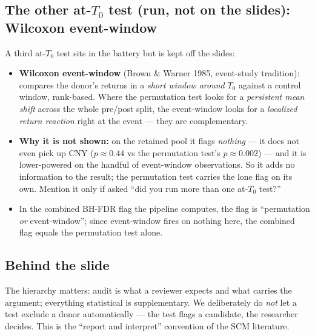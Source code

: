 \documentclass[11pt,a4paper]{article}
\newcommand{\highlight}[1]{\textcolor{accent}{\textbf{#1}}}
\begin{document}
\subsection{The other at-$T_0$ test (run, not on the slides): Wilcoxon event-window}
A third at-$T_0$ test sits in the battery but is kept off the slides:
\begin{itemize}
  \item \highlight{Wilcoxon event-window} (Brown \& Warner 1985, event-study tradition): compares the
    donor's returns in a \emph{short window around} $T_0$ against a control window, rank-based. Where the
    permutation test looks for a \emph{persistent mean shift} across the whole pre/post split, the
    event-window looks for a \emph{localized return reaction} right at the event --- they are complementary.
  \item \highlight{Why it is not shown:} on the retained pool it flags \emph{nothing} --- it does not even
    pick up CNY ($p \approx 0.44$ vs the permutation test's $p \approx 0.002$) --- and it is lower-powered
    on the handful of event-window observations. So it adds no information to the result; the permutation
    test carries the lone flag on its own. Mention it only if asked ``did you run more than one at-$T_0$ test?''
  \item In the combined BH-FDR flag the pipeline computes, the flag is ``permutation \emph{or} event-window'';
    since event-window fires on nothing here, the combined flag equals the permutation test alone.
\end{itemize}

\subsection{Behind the slide}
The hierarchy matters: audit is what a reviewer expects and what carries the argument; everything
statistical is supplementary. We deliberately do \emph{not} let a test exclude a donor automatically ---
the test flags a candidate, the researcher decides. This is the ``report and interpret'' convention of
the SCM literature.
\end{document}
